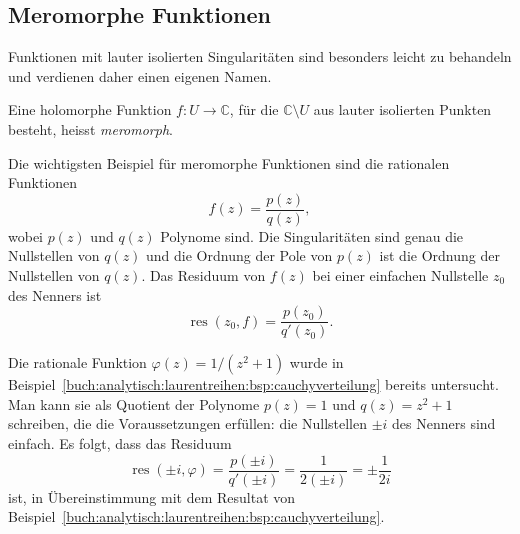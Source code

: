 %
%
%
\subsection{Meromorphe Funktionen}
Funktionen mit lauter isolierten Singularitäten sind besonders
leicht zu behandeln und verdienen daher einen eigenen Namen.

\begin{definition}
Eine holomorphe Funktion $f\colon U\to\mathbb{C}$,
für die $\mathbb{C}\setminus U$ aus lauter isolierten Punkten besteht,
heisst \emph{meromorph}.
%
\end{definition}

Die wichtigsten Beispiel für meromorphe Funktionen sind die rationalen
Funktionen
\[
f(z)
=
\frac{p(z)}{q(z)},
\]
wobei $p(z)$ und $q(z)$ Polynome sind.
%
Die Singularitäten sind genau die Nullstellen von $q(z)$ und die
Ordnung der Pole von $p(z)$ ist die Ordnung der Nullstellen von $q(z)$.
Das Residuum von $f(z)$ bei einer einfachen Nullstelle $z_0$ des Nenners
ist
\[
\operatorname{res}(z_0,f)
=
\frac{p(z_0)}{q'(z_0)}.
\]

\begin{beispiel}
Die rationale Funktion $\varphi(z) = 1/(z^2+1)$ wurde in
Beispiel~\ref{buch:analytisch:laurentreihen:bsp:cauchyverteilung}
bereits untersucht.
Man kann sie als Quotient der Polynome
$p(z)=1$ und $q(z)=z^2+1$ schreiben, die die Voraussetzungen
erfüllen: die Nullstellen $\pm i$ des Nenners sind einfach.
Es folgt, dass das Residuum
\[
\operatorname{res}(\pm i,\varphi)
=
\frac{p(\pm i)}{q'(\pm i)}
=
\frac{1}{2(\pm i)}
=
\pm\frac{1}{2i}
\]
ist, in Übereinstimmung mit dem Resultat von
Beispiel~\ref{buch:analytisch:laurentreihen:bsp:cauchyverteilung}.
\end{beispiel}

